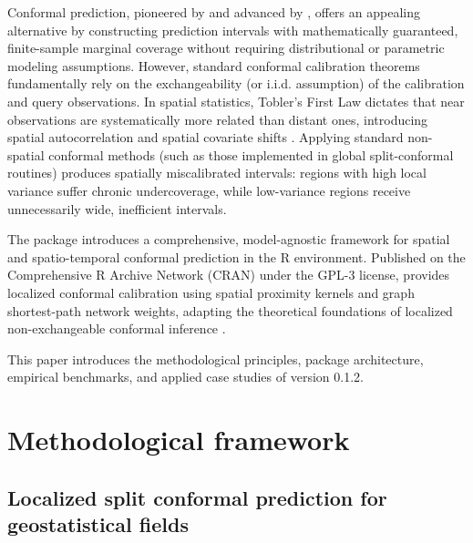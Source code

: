 Conformal prediction, pioneered by \citet{vovk2005algorithmic} and advanced by \citet{lei2018distribution}, offers an appealing alternative by constructing prediction intervals with mathematically guaranteed, finite-sample marginal coverage without requiring distributional or parametric modeling assumptions. However, standard conformal calibration theorems fundamentally rely on the exchangeability (or i.i.d. assumption) of the calibration and query observations. In spatial statistics, Tobler's First Law dictates that near observations are systematically more related than distant ones, introducing spatial autocorrelation and spatial covariate shifts \citep{tibshirani2019conformal, barber2023conformal}. Applying standard non-spatial conformal methods (such as those implemented in global split-conformal routines) produces spatially miscalibrated intervals: regions with high local variance suffer chronic undercoverage, while low-variance regions receive unnecessarily wide, inefficient intervals.

The  package \citep{spconformPkg} introduces a comprehensive, model-agnostic framework for spatial and spatio-temporal conformal prediction in the R environment. Published on the Comprehensive R Archive Network (CRAN) under the GPL-3 license,  provides localized conformal calibration using spatial proximity kernels and graph shortest-path network weights, adapting the theoretical foundations of localized non-exchangeable conformal inference \citep{barber2023conformal, mao2024valid}.

This paper introduces the methodological principles, package architecture, empirical benchmarks, and applied case studies of  version 0.1.2.

\section{Methodological framework}\label{methodological-framework}

\subsection{Localized split conformal prediction for geostatistical fields}\label{localized-split-conformal-prediction-for-geostatistical-fields}

